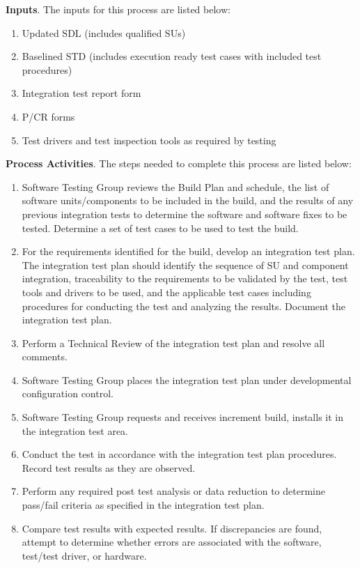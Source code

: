 \documentclass[a4paper, 11pt]{article}
\begin{document}
\textbf{Inputs}. The inputs for this process are listed below:
\begin{enumerate}
	\item Updated SDL (includes qualified SUs)
	\item Baselined STD (includes execution ready test cases with included test procedures)
	\item Integration test report form
	\item P/CR forms
	\item Test drivers and test inspection tools as required by testing
\end{enumerate}

\textbf{Process Activities}. The steps needed to complete this process are listed below:
\begin{enumerate}
	\item Software Testing Group reviews the Build Plan and schedule, the list of	software units/components to be included in the build, and the results of any previous	integration tests to determine the software and software fixes to be tested. Determine a set of test cases to be used to test the build.
	\item For the requirements identified for the build, develop an integration test plan. The integration test plan should identify the sequence of SU and component integration, traceability to the requirements to be validated by the test, test tools and drivers to be used, and the applicable test cases including procedures for conducting the test and	analyzing the results. Document the integration test plan.
	\item Perform a Technical Review of the integration test plan and resolve all comments.
	\item Software Testing Group places the integration test plan under developmental configuration control.
	\item Software Testing Group requests and receives increment build, installs it in the integration test area.
	\item Conduct the test in accordance with the integration test plan procedures. Record test	results as they are observed.
	\item Perform any required post test analysis or data reduction to determine pass/fail criteria as	specified in the integration test plan.
	\item Compare test results with expected results. If discrepancies are found, attempt to determine whether errors are associated with the software, test/test driver, or hardware.

\end{enumerate}
\end{document}
